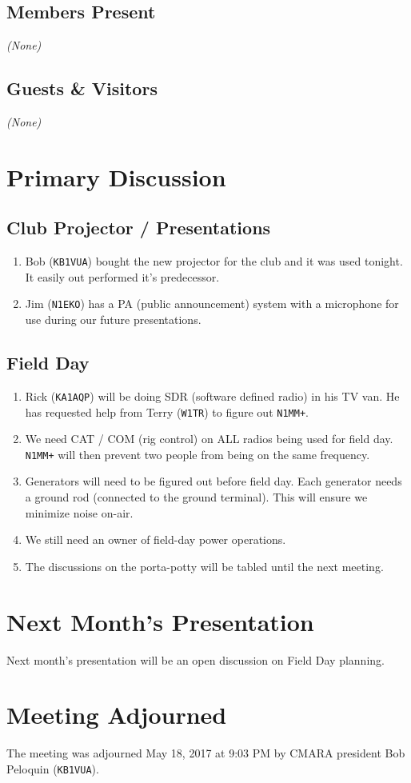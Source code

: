 \documentclass[10pt,letterpaper]{article}
\begin{document}
\subsection{Members Present}
\emph{(None)}

\subsection{Guests \& Visitors}
\emph{(None)}

\section{Primary Discussion}

\subsection{Club Projector / Presentations}
\begin{enumerate}
\item Bob (\texttt{KB1VUA}) bought the new projector for the club and it was used tonight. It easily out performed it's predecessor.
\item Jim (\texttt{N1EKO}) has a PA (public announcement) system with a microphone for use during our future presentations.
\end{enumerate}

\subsection{Field Day}
\begin{enumerate}
  \item Rick (\texttt{KA1AQP}) will be doing SDR (software defined radio) in his TV van. He has requested help from Terry (\texttt{W1TR}) to figure out \texttt{N1MM+}.
  \item We need CAT / COM (rig control) on ALL radios being used for field day. \texttt{N1MM+} will then prevent two people from being on the same frequency.
  \item Generators will need to be figured out before field day. Each generator needs a ground rod (connected to the ground terminal). This will ensure we minimize noise on-air.
  \item We still need an owner of field-day power operations.
  \item The discussions on the porta-potty will be tabled until the next meeting.
\end{enumerate}

\section{Next Month's Presentation}
Next month's presentation will be an open discussion on Field Day planning.

\section{Meeting Adjourned}
The meeting was adjourned May 18, 2017 at 9:03 PM by CMARA president Bob Peloquin (\texttt{KB1VUA}).
\end{document}
